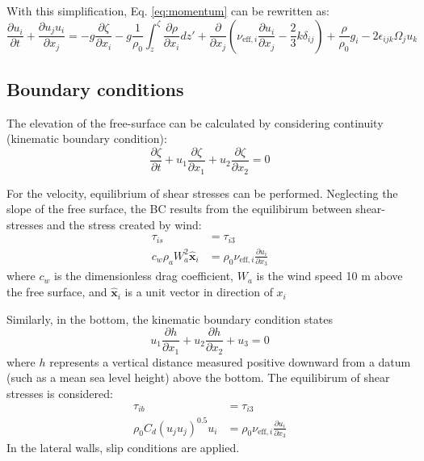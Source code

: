 With this simplification, Eq. \ref{eq:momentum} can be rewritten as:
\begin{equation}
    \frac{\partial u_i}{\partial t} +  \frac{\partial u_ju_i}{\partial x_j} = -g \frac{\partial \zeta}{\partial x_i} - g \frac{1}{\rho_0} \int_z^\zeta \frac{\partial \rho}{\partial x_i} dz' + \frac{\partial}{\partial x_j}\left( \nu_{\text{eff},i} \frac{\partial u_i}{\partial x_j}-\frac{2}{3}k \delta_{ij}\right) + \frac{\rho}{\rho_0}g_i - 2\epsilon_{ijk} \Omega_j u_k
    \label{eq:momentumPsimp}
\end{equation}

\subsection{Boundary conditions}
The elevation of the free-surface can be calculated by considering continuity (kinematic boundary condition):
\begin{equation}
    \frac{\partial \zeta}{\partial t} + u_1 \frac{\partial \zeta}{\partial x_1}+ u_2 \frac{\partial \zeta}{\partial x_2} = 0
    \label{eq:kinBC}
\end{equation}

For the velocity, equilibrium of shear stresses can be performed. Neglecting the slope of the free surface, the BC results from the equilibirum between shear-stresses and the stress created by wind:
\begin{align}
    \tau_{is} &= \tau_{i3}\\
    c_w\rho_aW_a^2 \hat{\textbf{x}}_i &= \rho_0 \nu_{\text{eff},i} \frac{\partial u_i}{\partial x_3}
    \label{eq:kinBC_b}
\end{align}
where $c_w$ is the dimensionless drag coefficient, $W_a$ is the wind speed 10 m above the free surface, and $\hat{\textbf{x}}_i$ is a unit vector in direction of $x_i$

Similarly, in the bottom, the kinematic boundary condition states
\begin{equation}
    u_1 \frac{\partial h}{\partial x_1} + u_2 \frac{\partial h}{\partial x_2} + u_3 = 0 
\end{equation}
where $h$ represents a vertical distance measured positive downward from a datum (such as a mean sea level height) above the bottom. The equilibirum of shear stresses is considered:
\begin{align}
    \tau_{ib} &= \tau_{i3}\\
    \rho_0 C_d (u_ju_j)^{0.5}u_i  &= \rho_0 \nu_{\text{eff},i} \frac{\partial u_i}{\partial x_3}
\end{align}
In the lateral walls, slip conditions are applied. 